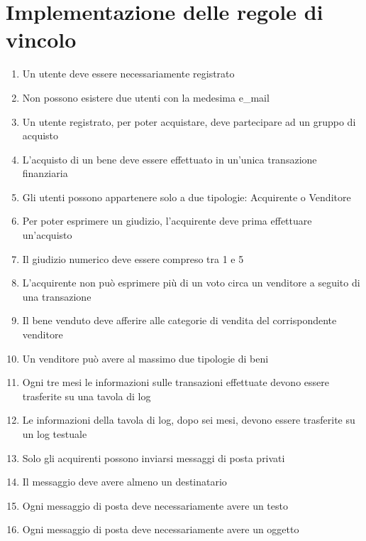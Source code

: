 \documentclass[a4paper, 10pt]{report}
\begin{document}
\chapter{Implementazione delle regole di vincolo}
\begin{enumerate}
\item Un utente deve essere necessariamente registrato
\item Non possono esistere due utenti con la medesima e\_mail
\item Un utente registrato, per poter acquistare, deve partecipare ad un gruppo di acquisto
\item L'acquisto di un bene deve essere effettuato in un'unica transazione finanziaria
\item Gli utenti possono appartenere solo a due tipologie: Acquirente o Venditore
\item Per poter esprimere un giudizio, l'acquirente deve prima effettuare un'acquisto
\item Il giudizio numerico deve essere compreso tra 1 e 5
\item L'acquirente non pu\`o esprimere pi\`u di un voto circa un venditore a seguito di una transazione
\item Il bene venduto deve afferire alle categorie di vendita del corrispondente venditore
\item Un venditore pu\`o avere al massimo due tipologie di beni
\item Ogni tre mesi le informazioni sulle transazioni effettuate devono essere trasferite su una tavola di log
\item Le informazioni della tavola di log, dopo sei mesi, devono essere trasferite su un log testuale
\item Solo gli acquirenti possono inviarsi messaggi di posta privati
\item Il messaggio deve avere almeno un destinatario
\item Ogni messaggio di posta deve necessariamente avere un testo
\item Ogni messaggio di posta deve necessariamente avere un oggetto
\end{enumerate}
\end{document}
